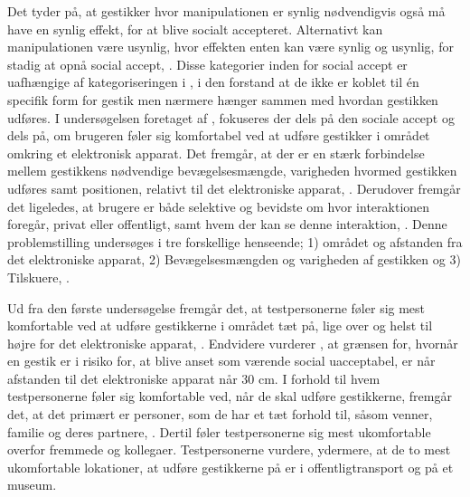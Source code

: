 Det tyder på, at gestikker hvor manipulationen er synlig nødvendigvis også må have en synlig effekt, for at blive socialt accepteret. Alternativt kan manipulationen være usynlig, hvor effekten enten kan være synlig og usynlig, for stadig at opnå social accept, \parencite[s. 278]{PDF:WouldYouDoThat}. Disse kategorier inden for social accept er uafhængige af kategoriseringen i , i den forstand at de ikke er koblet til én specifik form for gestik men nærmere hænger sammen med hvordan gestikken udføres.\blankline
%
I undersøgelsen foretaget af \textcite[s. 193]{PDF:AreYouComfortableDoingThat}, fokuseres der dels på den sociale accept og dels på, om brugeren føler sig komfortabel ved at udføre gestikker i området omkring et elektronisk apparat. Det fremgår, at der er en stærk forbindelse mellem gestikkens nødvendige bevægelsesmængde, varigheden hvormed gestikken udføres samt positionen, relativt til det elektroniske apparat, \parencite[s. 193]{PDF:AreYouComfortableDoingThat}. Derudover fremgår det ligeledes, at brugere er både selektive og bevidste om hvor interaktionen foregår, privat eller offentligt, samt hvem der kan se denne interaktion, \parencite[s. 193]{PDF:AreYouComfortableDoingThat}. Denne problemstilling undersøges i tre forskellige henseende; 1) området og afstanden fra det elektroniske apparat, 2) Bevægelsesmængden og varigheden af gestikken og 3) Tilskuere, \parencite[ss. 195-200]{PDF:AreYouComfortableDoingThat}. 

Ud fra den første undersøgelse fremgår det, at testpersonerne føler sig mest komfortable ved at udføre gestikkerne i området tæt på, lige over og helst til højre for det elektroniske apparat, \parencite[s. 197]{PDF:AreYouComfortableDoingThat}. Endvidere vurderer \textcite[s. 201]{PDF:AreYouComfortableDoingThat}, at grænsen for, hvornår en gestik er i risiko for, at blive anset som værende social uacceptabel, er når afstanden til det elektroniske apparat når 30 cm. I forhold til hvem testpersonerne føler sig komfortable ved, når de skal udføre gestikkerne, fremgår det, at det primært er personer, som de har et tæt forhold til, såsom venner, familie og deres partnere, \parencite[s. 196]{PDF:AreYouComfortableDoingThat}. Dertil føler testpersonerne sig mest ukomfortable overfor fremmede og kollegaer. Testpersonerne vurdere, ydermere, at de to mest ukomfortable lokationer, at udføre gestikkerne på er i offentligtransport og på et museum. 

